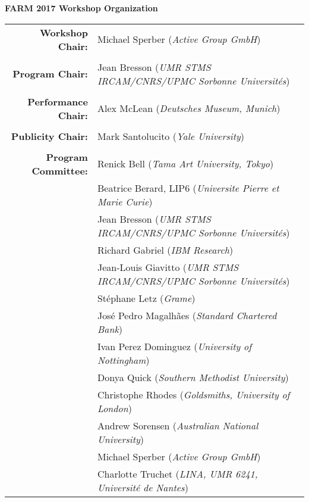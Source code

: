 \documentclass[sigplan]{acmart}
\begin{document}
\vspace{2mm}


\newpage

\begin{center}
{\bfseries \Huge FARM 2017 Workshop Organization}
\end{center}

\bigskip

\large
\begin{center}
\begin{tabular}{rl}

{\bf Workshop Chair:} & Michael Sperber (\emph{Active Group GmbH})\\
\\

{\bf Program Chair:} & Jean Bresson (\emph{UMR STMS IRCAM/CNRS/UPMC Sorbonne Universités})\\
  \\

  {\bf Performance Chair:} & Alex McLean (\emph{Deutsches Museum, Munich})\\
  \\

{\bf Publicity Chair:} & Mark Santolucito (\emph{Yale University})\\

\\
  
  {\bf Program Committee:} &
                             Renick Bell (\emph{Tama Art University, Tokyo})\\
  &Beatrice Berard, LIP6 (\emph{Universite Pierre et Marie Curie})\\
  &  Jean Bresson (\emph{UMR STMS IRCAM/CNRS/UPMC Sorbonne Universités})\\
  &  Richard Gabriel (\emph{IBM Research})\\
   & Jean-Louis Giavitto (\emph{UMR STMS IRCAM/CNRS/UPMC Sorbonne Universités})\\
   & Stéphane Letz (\emph{Grame})\\
   & José Pedro Magalhães (\emph{Standard Chartered Bank})\\
   & Ivan Perez Dominguez (\emph{University of Nottingham})\\
   & Donya Quick (\emph{Southern Methodist University})\\
    &Christophe Rhodes (\emph{Goldsmiths, University of London})\\
   & Andrew Sorensen (\emph{Australian National University})\\
   & Michael Sperber (\emph{Active Group GmbH})\\
   & Charlotte Truchet (\emph{LINA, UMR 6241, Université de Nantes})
\end{tabular}
\end{center}

\vspace{2mm}
\end{document}
